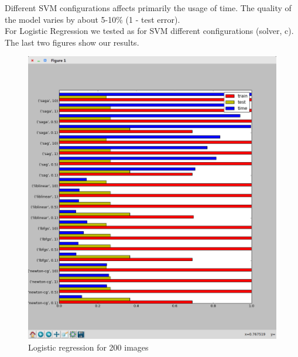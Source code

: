 Different SVM configurations affects primarily the usage of time. The quality of the model varies by about 5-10\% (1 - test error).\\

\newpage
For Logistic Regression we tested as for SVM different configurations (solver, c). The last two figures show our results.

\begin{figure}[!htb]
	\includegraphics[width=\textwidth]{images/logistic200}
	\caption{Logistic regression for 200 images}
\end{figure}

